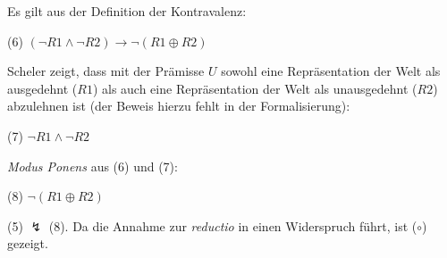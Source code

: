 \documentclass[a4paper, 12pt]{article}
\begin{document}
\noindent Es gilt aus der Definition der Kontravalenz: 

\vspace{4pt}
(6) \hspace*{1em}  $(\neg R1 \land \neg R2)  \rightarrow \neg (R1 \oplus R2)$
\vspace{4pt}

\noindent Scheler zeigt, dass mit der Prämisse $U$ sowohl eine Repräsentation der Welt als ausgedehnt ($R1$) als auch eine Repräsentation der Welt als unausgedehnt ($R2$) abzulehnen ist (der Beweis hierzu fehlt in der Formalisierung): 

\vspace{4pt}
(7) \hspace*{1em}  $\neg R1 \land \neg R2$

\vspace{4pt}
\noindent \emph{Modus Ponens} aus (6) und (7):

\vspace{4pt}
(8) \hspace*{1em} $\neg (R1 \oplus R2)$


\vspace{14pt}
\noindent (5) $\lightning$ (8).  Da die Annahme zur \emph{reductio} in einen Widerspruch führt, ist ($\circ$) gezeigt.
\end{document}
